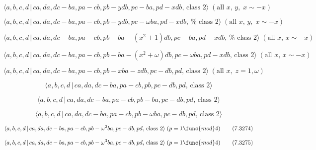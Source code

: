 \documentclass[10pt]{article}
\begin{document}
\begin{equation}
\langle a,b,c,d\,|\,ca,da,dc-ba,pa-cb,pb-ydb,pc-ba,pd-xdb,\,\text{class }%
2\rangle \;(\text{all }x,\,y,\;x\sim -x)  \tag{7.3266}
\end{equation}

\begin{equation}
\langle a,b,c,d\,|\,ca,da,dc-ba,pa-cb,pb-ydb,pc-\omega ba,pd-xdb,\,\text{%
class }2\rangle \;(\text{all }x,\,y,\;x\sim -x)  \tag{7.3267}
\end{equation}

\begin{equation}
\langle a,b,c,d\,|\,ca,da,dc-ba,pa-cb,pb-ba-(x^{2}+1)db,pc-ba,pd-xdb,\,\text{%
class }2\rangle \;(\text{all }x,\,x\sim -x)  \tag{7.3268}
\end{equation}

\begin{equation}
\langle a,b,c,d\,|\,ca,da,dc-ba,pa-cb,pb-ba-(x^{2}+\omega )db,pc-\omega
ba,pd-xdb,\,\text{class }2\rangle \;(\text{all }x,\,x\sim -x)  \tag{7.3269}
\end{equation}

\begin{equation}
\langle a,b,c,d\,|\,ca,da,dc-ba,pa-cb,pb-xba-zdb,pc-db,pd,\,\text{class }%
2\rangle \;(\text{all }x,\;z=1,\omega )  \tag{7.3270}
\end{equation}

\begin{equation}
\langle a,b,c,d\,|\,ca,da,dc-ba,pa-cb,pb,pc-db,pd,\,\text{class }2\rangle 
\tag{7.3271}
\end{equation}

\begin{equation}
\langle a,b,c,d\,|\,ca,da,dc-ba,pa-cb,pb-ba,pc-db,pd,\,\text{class }2\rangle
\tag{7.3272}
\end{equation}

\begin{equation}
\langle a,b,c,d\,|\,ca,da,dc-ba,pa-cb,pb-\omega ba,pc-db,pd,\,\text{class }%
2\rangle  \tag{7.3273}
\end{equation}

\begin{equation}
\langle a,b,c,d\,|\,ca,da,dc-ba,pa-cb,pb-\omega ^{2}ba,pc-db,pd,\,\text{%
class }2\rangle \;(p=1\func{mod}4)  \tag{7.3274}
\end{equation}

\begin{equation}
\langle a,b,c,d\,|\,ca,da,dc-ba,pa-cb,pb-\omega ^{3}ba,pc-db,pd,\,\text{%
class }2\rangle \;(p=1\func{mod}4)  \tag{7.3275}
\end{equation}
\end{document}
